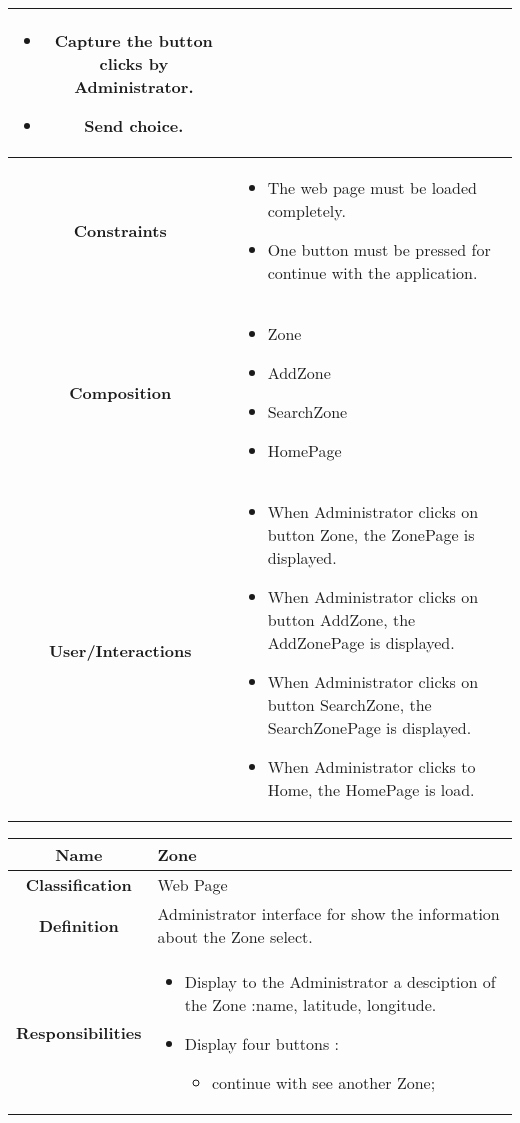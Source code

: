 \documentclass[11pt, a4paper,titlepage]{article}
\begin{document}
\begin{enumerate}
\begin{tabularx}{\textwidth}{| c | X |}
\begin{itemize}
		\item  Capture the button clicks by Administrator.
		\item Send choice.
	\end{itemize}
	\\
	\hline
	\textbf{Constraints} &
	\begin{itemize}
		\item  The web page must be loaded completely.
		\item One button must be pressed for continue with the application.
	\end{itemize}
	\\
	\hline
	\textbf{Composition} &
	\begin{itemize}
		\item Zone
		\item AddZone
		\item SearchZone
		\item HomePage
	\end{itemize}
	\\
	\hline
	\textbf{User/Interactions} &
	\begin{itemize}
		\item When Administrator clicks on button Zone, the ZonePage is displayed.
		\item When Administrator clicks on button AddZone, the AddZonePage is displayed.
		\item When Administrator clicks on button SearchZone, the SearchZonePage is displayed.
		\item When Administrator clicks to Home, the HomePage is load.
	\end{itemize}
	\\
	\hline 
\end{tabularx}
\begin{tabularx}{\textwidth}{| c | X |}
	\hline
	\textbf{Name} &
	Zone
	\\
	\hline
	\textbf{Classification} &
	Web Page
	\\
	\hline
	\textbf{Definition} &
	Administrator interface for show the information about the Zone select.\\
	\hline
	\textbf{Responsibilities} &
	\begin{itemize}
		\item Display to the Administrator a desciption of the Zone :name, latitude, longitude.
		\item Display four buttons :
		\begin{itemize}
			\item continue with see another Zone;

\end{itemize}
\end{itemize}
\end{tabularx}
\end{enumerate}
\end{document}
